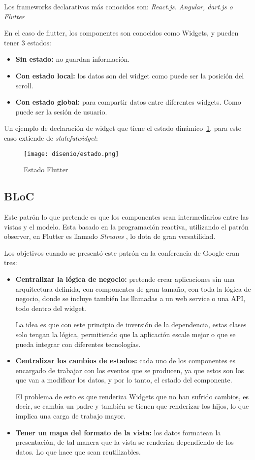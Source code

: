 Los frameworks declarativos más conocidos son: \emph{React.js. Angular, dart.js o Flutter}

En el caso de flutter, los componentes son conocidos como Widgets, y pueden tener 3 estados:

\begin{itemize}
	\item \textbf{Sin estado:} no guardan información.
	\item \textbf{Con estado local:} los datos son del widget como puede ser la posición del scroll.
	\item \textbf{Con estado global:} para compartir datos entre diferentes widgets. Como puede ser la sesión de usuario.
\end{itemize}

Un ejemplo de declaración de widget que tiene el estado dinámico~\ref{fig:estado}, para este caso extiende de \emph{statefulwidget}:
	\begin{figure}[H]
		\centering
		\texttt{[image: disenio/estado.png]}
		\caption{Estado Flutter}\label{fig:estado}
	\end{figure}

\subsection{BLoC}\label{bloc}
Este patrón lo que pretende es que los componentes sean intermediarios entre las vistas y el modelo. Esta basado en la programación reactiva, utilizando el patrón observer, en Flutter es llamado \emph{Streams} , lo dota de gran versatilidad.

Los objetivos cuando se presentó este patrón en la conferencia de Google eran tres:

\begin{itemize}
	\item \textbf{Centralizar la lógica de negocio:} pretende crear aplicaciones sin una arquitectura definida, con componentes de gran tamaño, con toda la lógica de negocio, donde se incluye también las llamadas a un web service o una API, todo dentro del widget.
	
	La idea es que con este principio de inversión de la dependencia, estas clases solo tengan la lógica, permitiendo que la aplicación escale mejor o que se pueda integrar con diferentes tecnologías.
	
	\item \textbf{Centralizar los cambios de estados:} cada uno de los componentes es encargado de trabajar con los eventos que se producen, ya que estos son los que van a modificar los datos, y por lo tanto, el estado del componente.
	
	El problema de esto es que renderiza Widgets que no han sufrido cambios, es decir, se cambia un padre y también se tienen que renderizar los hijos, lo que implica una carga de trabajo mayor.
	
	\item \textbf{Tener un mapa del formato de la vista:} los datos formatean la presentación, de tal manera que la vista se renderiza dependiendo de los datos. Lo que hace que sean reutilizables.
	
\end{itemize}

